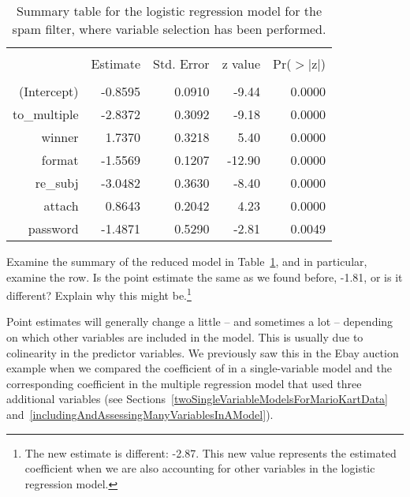 \begin{table}[ht]
\centering
\begin{tabular}{rrrrr}
  \hline
  \vspace{-3.7mm} & & & & \\
 & Estimate & Std. Error & z value & Pr($>$$|$z$|$) \\ 
  \hline
  \vspace{-3.8mm} & & & & \\
(Intercept) & -0.8595 & 0.0910 & -9.44 & 0.0000 \\ 
  to\_\hspace{0.3mm}multiple & -2.8372 & 0.3092 & -9.18 & 0.0000 \\ 
  winner & 1.7370 & 0.3218 & 5.40 & 0.0000 \\ 
  format & -1.5569 & 0.1207 & -12.90 & 0.0000 \\ 
  re\_\hspace{0.3mm}subj & -3.0482 & 0.3630 & -8.40 & 0.0000 \\ 
  attach & 0.8643 & 0.2042 & 4.23 & 0.0000 \\ 
  password & -1.4871 & 0.5290 & -2.81 & 0.0049 \\ 
\hline
\end{tabular}
\caption{Summary table for the logistic regression model for the spam filter, where variable selection has been performed.}
\label{emailLogisticReducedModel}
\end{table}

\begin{exercise}
Examine the summary of the reduced model in Table~\ref{emailLogisticReducedModel}, and in particular, examine the  row. Is the point estimate the same as we found before, -1.81, or is it different? Explain why this might be.\footnote{The new estimate is different: -2.87. This new value represents the estimated coefficient when we are also accounting for other variables in the logistic regression model.}
\end{exercise}

Point estimates will generally change a little -- and sometimes a lot -- depending on which other variables are included in the model. This is usually due to colinearity in the predictor variables. We previously saw this in the Ebay auction example when we compared the coefficient of  in a single-variable model and the corresponding coefficient in the multiple regression model that used three additional variables (see Sections~\ref{twoSingleVariableModelsForMarioKartData} and~\ref{includingAndAssessingManyVariablesInAModel}).

